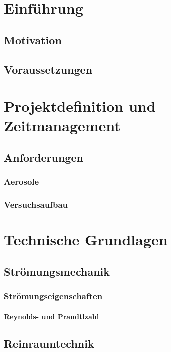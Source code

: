 \chapter{Einf\"{u}hrung}
\section{Motivation}
\section{Voraussetzungen}


\chapter{Projektdefinition und Zeitmanagement}\label{ch:project}


\section{Anforderungen}
\subsection{Aerosole}
\subsection{Versuchsaufbau}

\chapter{Technische Grundlagen}\label{ch:foundations}
\section{Str\"{o}mungsmechanik}
\subsection{Str\"{o}mungseigenschaften}
\subsubsection{Reynolds- und Prandtlzahl}

\section{Reinraumtechnik}
